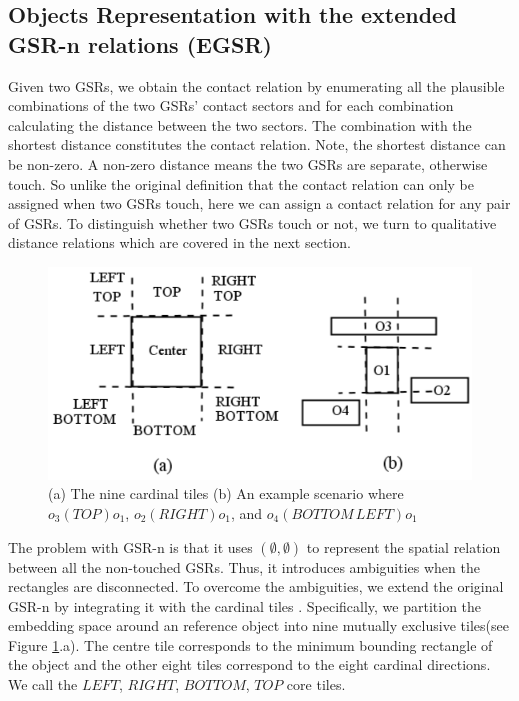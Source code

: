 \documentclass[letterpaper]{article}
\begin{document}
\subsection{Objects Representation with the extended GSR-n relations (EGSR)}

Given two GSRs, we obtain the contact relation by enumerating all the plausible combinations of the two GSRs' contact sectors and for each combination calculating the distance between the two sectors. The combination with the shortest distance constitutes the contact relation. Note, the shortest distance can be non-zero. A non-zero distance means the two GSRs are separate, otherwise touch. So unlike the original definition that the contact relation can only be assigned when two GSRs touch, here we can assign a contact relation for any pair of GSRs. To distinguish whether two GSRs touch or not, we turn to qualitative distance relations which are covered in the next section.
\begin{figure}[h!]
\centering\includegraphics[scale=0.35]{CardinalTiles.png}\caption{(a) The nine cardinal tiles (b) An example scenario where $o_3 (TOP) o_1$, $o_2 (RIGHT) o_1$, and $o_4 (BOTTOM\,LEFT) o_1$}
\label{CardinalTile}
\end{figure}
The problem with GSR-n is that it uses $(\emptyset, \emptyset)$ to represent the spatial relation between all the non-touched GSRs. Thus, it introduces ambiguities when the rectangles are disconnected. To overcome the ambiguities, we extend the original GSR-n by integrating it with the cardinal tiles \cite{goyal1997direction}. Specifically, we partition the embedding space around an reference object into nine mutually exclusive tiles(see Figure \ref{CardinalTile}.a). The centre tile corresponds to the minimum bounding rectangle of the object and the other eight tiles correspond to the eight cardinal directions. We call the $LEFT$, $RIGHT$, $BOTTOM$, $TOP$ core tiles.  
\end{document}

